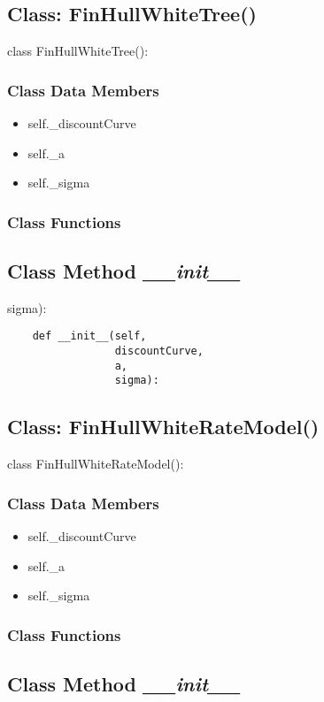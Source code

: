 \documentclass[twoside,11pt]{book}
\begin{document}
\subsection{Class: FinHullWhiteTree()}
class FinHullWhiteTree():

\subsubsection{Class Data Members}
\begin{itemize}
\item{self.\_discountCurve}
\item{self.\_a}
\item{self.\_sigma}
\end{itemize}

\subsubsection{Class Functions}

\subsection{Class Method {\it \_\_init\_\_}}
sigma):

\begin{lstlisting}
    def __init__(self,
                 discountCurve,
                 a,
                 sigma):
\end{lstlisting}

\subsection{Class: FinHullWhiteRateModel()}
class FinHullWhiteRateModel():

\subsubsection{Class Data Members}
\begin{itemize}
\item{self.\_discountCurve}
\item{self.\_a}
\item{self.\_sigma}
\end{itemize}

\subsubsection{Class Functions}

\subsection{Class Method {\it \_\_init\_\_}}
\end{document}
